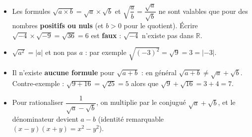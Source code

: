 \documentclass[11pt]{article}
\begin{document}
\begin{attention}
\begin{itemize}
    \item Les formules $\sqrt{a \times b} = \sqrt{a}\times\sqrt{b}$ et $\sqrt{\dfrac{a}{b}} = \dfrac{\sqrt{a}}{\sqrt{b}}$ ne sont valables que pour des nombres \textbf{positifs ou nuls} (et $b > 0$ pour le quotient). Écrire $\sqrt{-4} \times \sqrt{-9} = \sqrt{36} = 6$ est \textbf{faux} : $\sqrt{-4}$ n'existe pas dans $\mathbb{R}$.
    \item $\sqrt{a^2} = |a|$ et non pas $a$ : par exemple $\sqrt{(-3)^2} = \sqrt{9} = 3 = |-3|$.
    \item Il n'existe \textbf{aucune formule} pour $\sqrt{a+b}$ : en général $\sqrt{a+b} \neq \sqrt{a} + \sqrt{b}$. Contre-exemple : $\sqrt{9+16} = \sqrt{25} = 5$ alors que $\sqrt{9} + \sqrt{16} = 3 + 4 = 7$.
    \item Pour rationaliser $\dfrac{1}{\sqrt{a}-\sqrt{b}}$, on multiplie par le conjugué $\sqrt{a}+\sqrt{b}$, et le dénominateur devient $a - b$ (identité remarquable $(x-y)(x+y) = x^2 - y^2$).
\end{itemize}
\end{attention}
\end{document}
